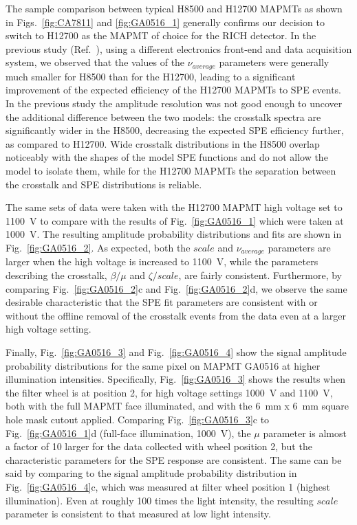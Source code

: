 The sample comparison between typical H8500 and H12700 MAPMTs as shown in Figs.~\ref{fig:CA7811} and \ref{fig:GA0516_1} generally confirms our decision to switch to H12700 as the MAPMT of choice for the RICH detector. In the previous study (Ref.~\cite{DEGTIARENKO20171}), using a different electronics front-end and data acquisition system, we observed that the values of the $\nu_{average}$ parameters were generally much smaller for H8500 than for the H12700, leading to a significant improvement of the expected efficiency of the H12700 MAPMTs to SPE events. In the previous study the amplitude resolution was not good enough to uncover the additional difference between the two models: the crosstalk spectra are significantly wider in the H8500, decreasing the expected SPE efficiency further, as compared to H12700. Wide crosstalk distributions in the H8500 overlap noticeably with the shapes of the model SPE functions and do not allow the model to isolate them, while for the H12700 MAPMTs the separation between the crosstalk and SPE distributions is reliable.  

The same sets of data were taken with the H12700 MAPMT high voltage set to 1100~V to compare with the results of Fig.~\ref{fig:GA0516_1} which were taken at 1000~V. 
The resulting amplitude probability distributions and fits are shown in Fig.~\ref{fig:GA0516_2}. 
As expected, both the $scale$ and $\nu_{average}$ parameters are larger when the high voltage is increased to 1100~V, while the parameters describing the crosstalk, $\beta/\mu$ and $\zeta/scale$, are fairly consistent. 
Furthermore, by comparing Fig.~\ref{fig:GA0516_2}c and Fig.~\ref{fig:GA0516_2}d, we observe the same desirable characteristic that the SPE fit parameters are consistent with or without the offline removal of the crosstalk events from the data even at a larger high voltage setting.


Finally, Fig.~\ref{fig:GA0516_3} and Fig.~\ref{fig:GA0516_4} show the signal amplitude probability distributions for the same pixel on MAPMT GA0516 at higher illumination intensities. 
Specifically, Fig.~\ref{fig:GA0516_3} shows the results when the filter wheel is at position 2, for high voltage settings 1000~V and 1100~V, both with the full MAPMT face illuminated, and with the 6~mm x 6~mm square hole mask cutout applied. 
Comparing Fig.~\ref{fig:GA0516_3}c to Fig.~\ref{fig:GA0516_1}d (full-face illumination, 1000~V), the $\mu$ parameter is almost a factor of 10 larger for the data collected with wheel position 2, but the characteristic parameters for the SPE response are consistent. 
The same can be said by comparing to the signal amplitude probability distribution in Fig.~\ref{fig:GA0516_4}c, which was measured at filter wheel position 1 (highest illumination). 
Even at roughly 100 times the light intensity, the resulting $scale$ parameter is consistent to that measured at low light intensity. 

